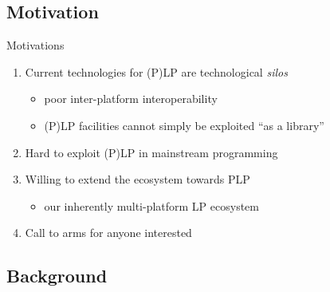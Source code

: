 \documentclass[presentation]{beamer}\mode<presentation>{\usetheme{AMSBolognaFC}}
\begin{document}
\subsection{Motivation}

\begin{frame}[c]{Motivations}

    \begin{enumerate}
        \item Current technologies for (P)LP are \alert{technological \emph{silos}}
        \begin{itemize}
            \item poor \alert{inter-platform} interoperability
            \item (P)LP facilities cannot simply be exploited \alert{``as a library''}
        \end{itemize}

        \bigskip

        \item Hard to exploit (P)LP in mainstream programming

        \bigskip

        \item Willing to extend the \twopkt{} ecosystem towards PLP
        \begin{itemize}
            \item our inherently multi-platform LP ecosystem
        \end{itemize}

        \bigskip

        \item Call to arms for anyone interested

    \end{enumerate}

\end{frame}

\subsection{Background}
\end{document}
